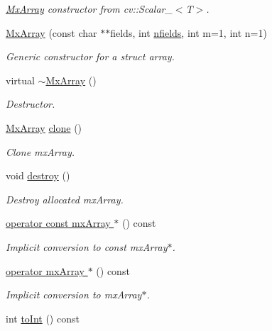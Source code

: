 \begin{DoxyCompactItemize}
\begin{DoxyCompactList}\small\item\em \hyperlink{class_mx_array}{\-Mx\-Array} constructor from cv\-::\-Scalar\-\_\-$<$\-T$>$. \end{DoxyCompactList}\item 
\hyperlink{class_mx_array_a3d79d00a7db91086a7770021ef25ecf2}{\-Mx\-Array} (const char $\ast$$\ast$fields, int \hyperlink{class_mx_array_aaafc4e535b9825a5690f056024cba34a}{nfields}, int m=1, int n=1)
\begin{DoxyCompactList}\small\item\em \-Generic constructor for a struct array. \end{DoxyCompactList}\item 
virtual \hyperlink{class_mx_array_a4345e9b5971748ec4a7419dab42de4ef}{$\sim$\-Mx\-Array} ()
\begin{DoxyCompactList}\small\item\em \-Destructor. \end{DoxyCompactList}\item 
\hyperlink{class_mx_array}{\-Mx\-Array} \hyperlink{class_mx_array_a86dda6d0020a5a21c4b7e5f80205a344}{clone} ()
\begin{DoxyCompactList}\small\item\em \-Clone mx\-Array. \end{DoxyCompactList}\item 
void \hyperlink{class_mx_array_aeab469ebea779b8e3cf7e07e4459b925}{destroy} ()
\begin{DoxyCompactList}\small\item\em \-Destroy allocated mx\-Array. \end{DoxyCompactList}\item 
\hyperlink{class_mx_array_a4b2de94745c1f0ae157e554b1bdbe1af}{operator const mx\-Array $\ast$} () const 
\begin{DoxyCompactList}\small\item\em \-Implicit conversion to const mx\-Array$\ast$. \end{DoxyCompactList}\item 
\hyperlink{class_mx_array_aed90283d5d07e0e4973cc9ac8b431d32}{operator mx\-Array $\ast$} () const 
\begin{DoxyCompactList}\small\item\em \-Implicit conversion to mx\-Array$\ast$. \end{DoxyCompactList}\item 
int \hyperlink{class_mx_array_a438400755505700235e1c71fa9a42354}{to\-Int} () const 
$$
\end{DoxyCompactItemize}
